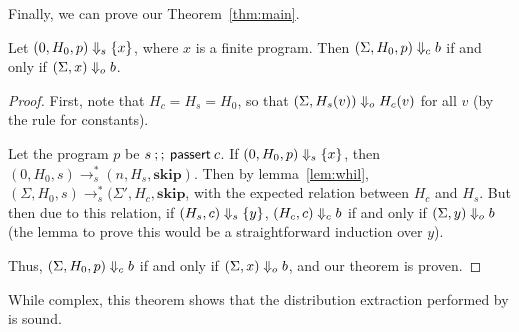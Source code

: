 Finally, we can prove our Theorem~\ref{thm:main}.

\begin{theorem}
Let $(0, H_0, p) \Downarrow_s \{ x \}$, where $x$ is a finite program.
Then $(\Sigma, H_0, p) \Downarrow_c b$ if and only if $(\Sigma, x) \Downarrow_o b$.
\end{theorem}

\begin{proof}
  First, note that $H_c = H_s = H_0$, so that
  $(\Sigma, H_s(v)) \Downarrow_o H_c(v)$ for all $v$
  (by the rule for constants).

  Let the program $p$ be $s\:;;\:\textsf{passert}\:c$.
  If $(0, H_0, p) \Downarrow_s \{ x \}$, then
  $(0, H_0, s) \to_s^* (n, H_s, \mathbf{skip})$.
  Then by lemma~\ref{lem:whil},
  $(\Sigma, H_0, s) \to_s^* (\Sigma', H_c, \mathbf{skip}$,
  with the expected relation between $H_c$ and $H_s$.
  But then due to this relation,
  if $(H_s, c) \Downarrow_s \{ y \}$,
  $(H_c, c) \Downarrow_c b$ if and only if $(\Sigma, y) \Downarrow_o b$
  (the lemma to prove this would be a straightforward induction over $y$).

  Thus, $(\Sigma, H_0, p) \Downarrow_c b$ if
  and only if $(\Sigma, x) \Downarrow_o b$,
  and our theorem is proven.
\end{proof}

While complex, this theorem shows that the distribution extraction
performed by \tool is sound.
